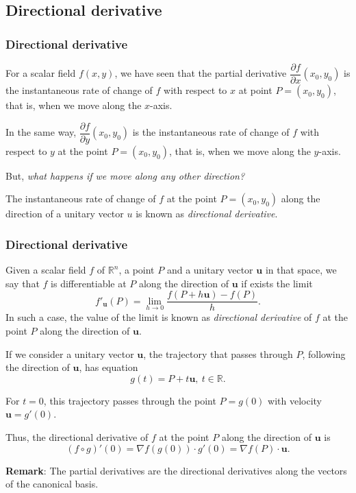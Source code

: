\subsection{Directional derivative}
\begin{frame}
\frametitle{Directional derivative}
For a scalar field $f(x,y)$, we have seen that the partial derivative $\dfrac{\partial f}{\partial x}(x_0,y_0)$ is the instantaneous rate of change of $f$ with respect to $x$ at point $P=(x_0,y_0)$, that is, when we move along the $x$-axis.

In the same way, $\dfrac{\partial f}{\partial y}(x_0,y_0)$ is the instantaneous rate of change of $f$ with respect to $y$ at the point $P=(x_0,y_0)$, that is, when we move along the $y$-axis.

But, \emph {what happens if we move along any other direction?}

The instantaneous rate of change of $f$ at the point $P=(x_0,y_0)$ along the direction of a unitary vector $u$ is known as \emph{directional derivative}.
\end{frame}


\begin{frame}
\frametitle{Directional derivative}
\begin{definition}
Given a scalar field $f$ of $\mathbb{R}^n$, a point $P$ and a unitary vector $\mathbf{u}$ in that space, we say that $f$ is differentiable at $P$ along the direction of $\mathbf{u}$ if exists the limit
\[
f'_{\mathbf{u}}(P) = \lim_{h\rightarrow 0}\frac{f(P+h\mathbf{u})-f(P)}{h}.
\]
In such a case, the value of the limit is known as \emph{directional derivative} of $f$ at the point $P$ along the direction of $\mathbf{u}$.
\end{definition}

If we consider a unitary vector $\mathbf{u}$, the trajectory that passes through $P$, following the direction of $\mathbf{u}$, has equation
\[
g(t)=P+t\mathbf{u},\ t\in\mathbb{R}.
\]

For $t=0$, this trajectory passes through the point $P=g(0)$ with velocity $\mathbf{u}=g'(0)$.

Thus, the directional derivative of $f$ at the point $P$ along the direction of $\mathbf{u}$ is
\[
(f\circ g)'(0) = \nabla f(g(0))\cdot g'(0) = \nabla f(P)\cdot \mathbf{u}.
\]

\textbf{Remark}: The partial derivatives are the directional derivatives along the vectors of the canonical basis.
\end{frame}


